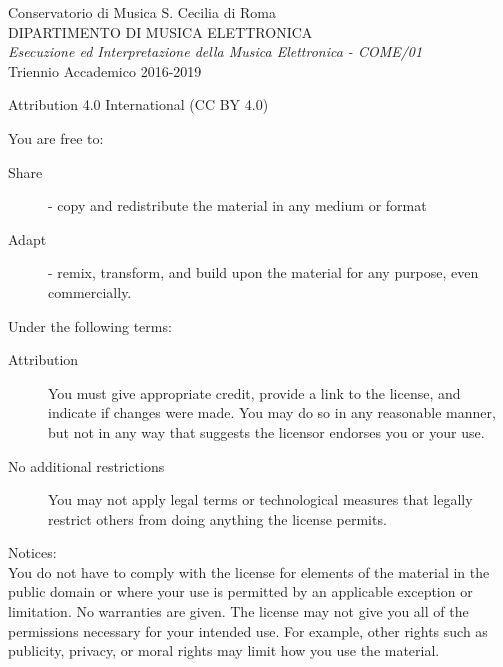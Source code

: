 
\thispagestyle{empty}

Conservatorio di Musica S. Cecilia di Roma \\
DIPARTIMENTO DI MUSICA ELETTRONICA \\
\emph{Esecuzione ed Interpretazione della Musica Elettronica - COME/01} \\
Triennio Accademico 2016-2019
\vfill

Attribution 4.0 International (CC BY 4.0)

You are free to:
\begin{description}
	\item[Share] - copy and redistribute the material in any medium or format
	\item[Adapt] - remix, transform, and build upon the material for any purpose, even commercially.
\end{description}

Under the following terms:
\begin{description}
	\item[Attribution] You must give appropriate credit, provide a link to the license, and indicate if
	changes were made. You may do so in any reasonable manner, but not in any way that suggests the licensor
	endorses you or your use.
	\item[No additional restrictions] You may not apply legal terms or technological measures that legally
	restrict others from doing anything the license permits.
\end{description}

Notices:\\
You do not have to comply with the license for elements of the material in the public domain or where your
use is permitted by an applicable exception or limitation. No warranties are given. The license may not give
you all of the permissions necessary for your intended use. For example, other rights such as publicity,
privacy, or moral rights may limit how you use the material.
